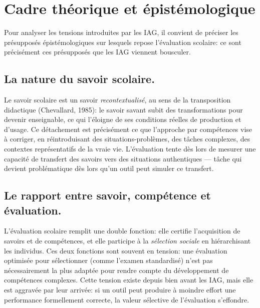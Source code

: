 \newpage
\section{Cadre th\'eorique et \'epist\'emologique}\label{sec:cadre}

Pour analyser les tensions introduites par les IAG, il convient de pr\'eciser les pr\'esuppos\'es \'epist\'emologiques sur lesquels repose l'\'evaluation scolaire: ce sont pr\'ecis\'ement ces pr\'esuppos\'es que les IAG viennent bousculer.

\subsection{La nature du savoir scolaire.}
Le savoir scolaire est un savoir \emph{recontextualis\'e}, au sens de la transposition didactique (Chevallard, 1985): le savoir savant subit des transformations pour devenir enseignable, ce qui l'\'eloigne de ses conditions r\'eelles de production et d'usage. 
Ce d\'etachement est pr\'ecis\'ement ce que l'approche par comp\'etences vise \`a corriger, en r\'eintroduisant des situations-probl\`emes, des t\^aches complexes, des contextes repr\'esentatifs de la \og{}vraie vie\fg{}. 
L'\'evaluation tente d\`es lors de mesurer une capacit\'e de transfert des savoirs vers des situations authentiques --- t\^ache qui devient probl\'ematique d\`es lors qu'un outil peut simuler ce transfert.

\subsection{Le rapport entre savoir, comp\'etence et \'evaluation.}
L'\'evaluation scolaire remplit une double fonction: elle certifie l'acquisition de savoirs et de comp\'etences, et elle participe \`a la \emph{s\'election sociale} en hi\'erarchisant les individus. 
Ces deux fonctions sont souvent en tension: une \'evaluation optimis\'ee pour s\'electionner (comme l'examen standardis\'e) n'est pas n\'ecessairement la plus adapt\'ee pour rendre compte du d\'eveloppement de comp\'etences complexes. 
Cette tension existe depuis bien avant les IAG, mais elle est aggrav\'ee par leur arriv\'ee: si un outil peut produire \`a moindre effort une performance formellement correcte, la valeur s\'elective de l'\'evaluation s'effondre.

